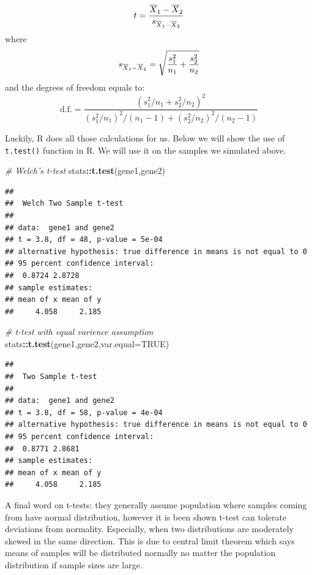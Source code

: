 \documentclass[12pt,]{krantz}
\newenvironment{Shaded}{\begin{snugshade}}{\end{snugshade}}
\newcommand{\CommentTok}[1]{\textcolor[rgb]{0.56,0.35,0.01}{\textit{#1}}}
\newcommand{\DataTypeTok}[1]{\textcolor[rgb]{0.13,0.29,0.53}{#1}}
\newcommand{\KeywordTok}[1]{\textcolor[rgb]{0.13,0.29,0.53}{\textbf{#1}}}
\newcommand{\NormalTok}[1]{#1}
\newcommand{\OperatorTok}[1]{\textcolor[rgb]{0.81,0.36,0.00}{\textbf{#1}}}
\newcommand{\OtherTok}[1]{\textcolor[rgb]{0.56,0.35,0.01}{#1}}
\begin{document}
\[t = {\overline{X}_1 - \overline{X}_2 \over s_{\overline{X}_1 - \overline{X}_2}}\]
where
\[s_{\overline{X}_1 - \overline{X}_2} = \sqrt{{s_1^2 \over n_1} + {s_2^2  \over n_2}}
\]
and the degrees of freedom equals to:
\[\mathrm{d.f.} = \frac{(s_1^2/n_1 + s_2^2/n_2)^2}{(s_1^2/n_1)^2/(n_1-1) + (s_2^2/n_2)^2/(n_2-1)}
\]

Luckily, R does all those calculations for us. Below we will show the use of \texttt{t.test()} function in R. We will use it on the samples we simulated
above.

\begin{Shaded}
\begin{Highlighting}[]
\CommentTok{# Welch's t-test}
\NormalTok{stats}\OperatorTok{::}\KeywordTok{t.test}\NormalTok{(gene1,gene2)}
\end{Highlighting}
\end{Shaded}

\begin{verbatim}
## 
##  Welch Two Sample t-test
## 
## data:  gene1 and gene2
## t = 3.8, df = 48, p-value = 5e-04
## alternative hypothesis: true difference in means is not equal to 0
## 95 percent confidence interval:
##  0.8724 2.8728
## sample estimates:
## mean of x mean of y 
##     4.058     2.185
\end{verbatim}

\begin{Shaded}
\begin{Highlighting}[]
\CommentTok{# t-test with equal varience assumption}
\NormalTok{stats}\OperatorTok{::}\KeywordTok{t.test}\NormalTok{(gene1,gene2,}\DataTypeTok{var.equal=}\OtherTok{TRUE}\NormalTok{)}
\end{Highlighting}
\end{Shaded}

\begin{verbatim}
## 
##  Two Sample t-test
## 
## data:  gene1 and gene2
## t = 3.8, df = 58, p-value = 4e-04
## alternative hypothesis: true difference in means is not equal to 0
## 95 percent confidence interval:
##  0.8771 2.8681
## sample estimates:
## mean of x mean of y 
##     4.058     2.185
\end{verbatim}

A final word on t-tests: they generally assume population where samples coming
from have normal
distribution, however it is been shown t-test can tolerate deviations from
normality. Especially, when two distributions are moderately skewed in the
same direction. This is due to central limit theorem which says means of
samples will be distributed normally no matter the population distribution
if sample sizes are large.
\end{document}
